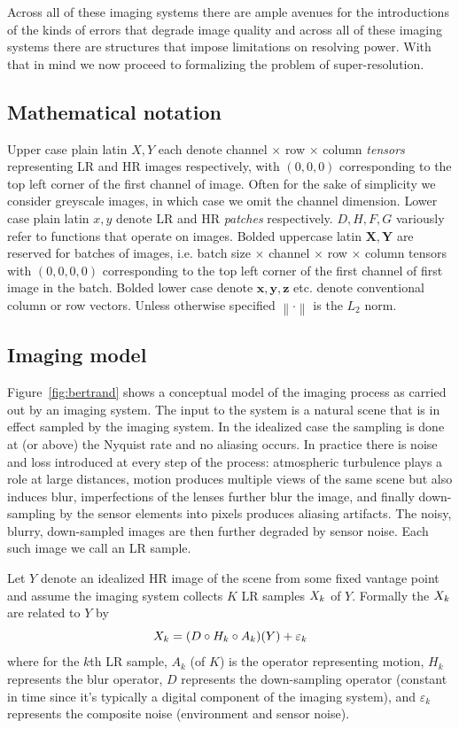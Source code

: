 Across all of these imaging systems there are ample avenues for the introductions of the kinds of errors that degrade image quality and across all of these imaging systems there are structures that impose limitations on resolving power.
%
With that in mind we now proceed to formalizing the problem of super-resolution.

\subsection{Mathematical notation}\label{subsec:notation}
Upper case plain latin $X, Y$ each denote channel $\times$ row $\times$ column \textit{tensors} representing LR and HR images respectively, with $(0, 0,0)$ corresponding to the top left corner of the first channel of image.
%
Often for the sake of simplicity we consider greyscale images, in which case we omit the channel dimension.
%
Lower case plain latin $x, y$ denote LR and HR \textit{patches} respectively.
%
$D, H, F, G$ variously refer to functions that operate on images.
%
Bolded uppercase latin $\bm{X}, \bm{Y}$ are reserved for batches of images, i.e. batch size $\times$ channel $\times$ row $\times$ column tensors with $(0, 0, 0,0)$ corresponding to the top left corner of the first channel of first image in the batch.
%
Bolded lower case denote $\bm{x}, \bm{y}, \bm{z}$ etc. denote conventional column or row vectors.
%
Unless otherwise specified $\left\| \cdot \right\|$ is the $L_2$ norm.

\subsection{Imaging model}\label{subsec:imaging-model}

Figure~\ref{fig:bertrand} shows a conceptual model of the imaging process as carried out by an imaging system.
%
The input to the system is a natural scene that is in effect sampled by the imaging system.
%
In the idealized case the sampling is done at (or above) the Nyquist rate and no aliasing occurs.
%
In practice there is noise and loss introduced at every step of the process: atmospheric turbulence plays a role at large distances, motion produces multiple views of the same scene but also induces blur, imperfections of the lenses further blur the image, and finally down-sampling by the sensor elements into pixels produces aliasing artifacts.
%
The noisy, blurry, down-sampled images are then further degraded by sensor noise.
%
Each such image we call an LR sample.

Let $Y$ denote an idealized HR image of the scene from some fixed vantage point and assume the imaging system collects $K$ LR samples $X_k$ of $Y$.
%
Formally the $X_k$ are related to $Y$ by
\begin{equation}
    X_k = (D \circ H_k \circ A_k) (Y) + \varepsilon_k
    \label{eqn:imagingmodel}
\end{equation}
where for the $k$th LR sample, $A_k$ (of $K$) is the operator representing motion, $H_k$ represents the blur operator, $D$ represents the down-sampling operator (constant in time since it's typically a digital component of the imaging system), and $\varepsilon_k$ represents the composite noise (environment and sensor noise).

